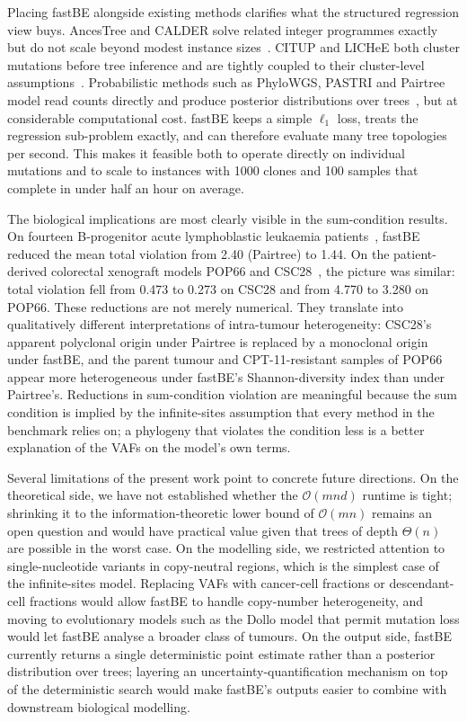 \documentclass[11pt]{article}
\begin{document}
Placing fastBE alongside existing methods clarifies what the structured regression view buys. AncesTree and CALDER solve related integer programmes exactly but do not scale beyond modest instance sizes~\citep{elkebir2015reconstruction,myers2019calder}. CITUP and LICHeE both cluster mutations before tree inference and are tightly coupled to their cluster-level assumptions~\citep{malikic2015citup,popic2015lichee}. Probabilistic methods such as PhyloWGS, PASTRI and Pairtree model read counts directly and produce posterior distributions over trees~\citep{deshwar2015phylowgs,satas2017pastri,wintersinger2022pairtree}, but at considerable computational cost. fastBE keeps a simple $\ell_1$ loss, treats the regression sub-problem exactly, and can therefore evaluate many tree topologies per second. This makes it feasible both to operate directly on individual mutations and to scale to instances with 1000 clones and 100 samples that complete in under half an hour on average.

The biological implications are most clearly visible in the sum-condition results. On fourteen B-progenitor acute lymphoblastic leukaemia patients~\citep{wintersinger2022pairtree}, fastBE reduced the mean total violation from 2.40 (Pairtree) to 1.44. On the patient-derived colorectal xenograft models POP66 and CSC28~\citep{rehman2021diapause,ulintz2018polyclonal}, the picture was similar: total violation fell from 0.473 to 0.273 on CSC28 and from 4.770 to 3.280 on POP66. These reductions are not merely numerical. They translate into qualitatively different interpretations of intra-tumour heterogeneity: CSC28's apparent polyclonal origin under Pairtree is replaced by a monoclonal origin under fastBE, and the parent tumour and CPT-11-resistant samples of POP66 appear more heterogeneous under fastBE's Shannon-diversity index than under Pairtree's. Reductions in sum-condition violation are meaningful because the sum condition is implied by the infinite-sites assumption that every method in the benchmark relies on; a phylogeny that violates the condition less is a better explanation of the VAFs on the model's own terms.

Several limitations of the present work point to concrete future directions. On the theoretical side, we have not established whether the $\mathcal{O}(mnd)$ runtime is tight; shrinking it to the information-theoretic lower bound of $\mathcal{O}(mn)$ remains an open question and would have practical value given that trees of depth $\Theta(n)$ are possible in the worst case. On the modelling side, we restricted attention to single-nucleotide variants in copy-neutral regions, which is the simplest case of the infinite-sites model. Replacing VAFs with cancer-cell fractions or descendant-cell fractions would allow fastBE to handle copy-number heterogeneity, and moving to evolutionary models such as the Dollo model that permit mutation loss would let fastBE analyse a broader class of tumours. On the output side, fastBE currently returns a single deterministic point estimate rather than a posterior distribution over trees; layering an uncertainty-quantification mechanism on top of the deterministic search would make fastBE's outputs easier to combine with downstream biological modelling.
\end{document}
